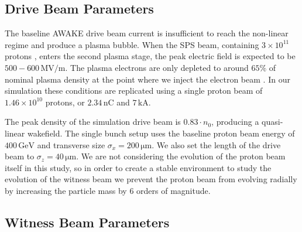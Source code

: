 \documentclass[aps,prstab,reprint,amsmath,amssymb,groupedaddress]{revtex4-1}
\newcommand{\unit}[1]{\,\mathrm{#1}}
\newcommand{\funit}[2]{\,\mathrm{#1}/\mathrm{#2}}
\newcommand{\nexp}[1]{\times 10^{#1}}
\begin{document}
\subsection{Drive Beam Parameters}\label{S:M:Setup}


The baseline AWAKE drive beam current is insufficient to reach the non-linear regime and produce a plasma bubble. When
the SPS beam, containing $3\nexp{11}$ protons \cite{gschwendtner:2016}, enters the second plasma stage, the peak
electric field is expected to be $500-600\funit{MV}{m}$. The plasma electrons are only depleted to around $65\%$ of
nominal plasma density at the point where we inject the electron beam \cite{awake_collaboration:2016}. In our simulation
these conditions are replicated using a single proton beam of $1.46\nexp{10}$ protons, or $2.34\unit{nC}$ and
$7\unit{kA}$.

The peak density of the simulation drive beam is $0.83\cdot n_{0}$, producing a quasi-linear wakefield. The single bunch
setup uses the baseline proton beam energy of $400\unit{GeV}$ and transverse size $\sigma_{x} = 200\unit{\mu m}$. We
also set the length of the drive beam to $\sigma_{z} = 40\unit{\mu m}$. We are not considering the evolution of the
proton beam itself in this study, so in order to create a stable environment to study the evolution of the witness beam
we prevent the proton beam from evolving radially by increasing the particle mass by 6 orders of magnitude.

\subsection{Witness Beam Parameters}\label{S:M:Setup}
\end{document}
